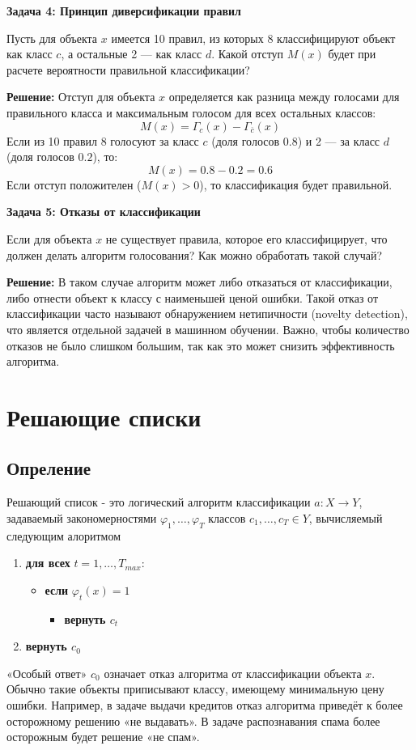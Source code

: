 \textbf{Задача 4: Принцип диверсификации правил}

Пусть для объекта $x$ имеется 10 правил, из которых 8 классифицируют объект как класс $c$, а остальные 2 — как класс $d$. Какой отступ $M(x)$ будет при расчете вероятности правильной классификации?

\textbf{Решение:}  
Отступ для объекта $x$ определяется как разница между голосами для правильного класса и максимальным голосом для всех остальных классов:
\[
M(x) = \Gamma_c(x) - \Gamma_{\overline{c}}(x)
\]
Если из 10 правил 8 голосуют за класс $c$ (доля голосов $0.8$) и 2 — за класс $d$ (доля голосов $0.2$), то:
\[
M(x) = 0.8 - 0.2 = 0.6
\]
Если отступ положителен ($M(x) > 0$), то классификация будет правильной.

\textbf{Задача 5: Отказы от классификации}

Если для объекта $x$ не существует правила, которое его классифицирует, что должен делать алгоритм голосования? Как можно обработать такой случай?

\textbf{Решение:}  
В таком случае алгоритм может либо отказаться от классификации, либо отнести объект к классу с наименьшей ценой ошибки. Такой отказ от классификации часто называют обнаружением нетипичности (novelty detection), что является отдельной задачей в машинном обучении. Важно, чтобы количество отказов не было слишком большим, так как это может снизить эффективность алгоритма.


\section{Решающие списки}
\subsection{Опреление}
    Решающий список - это логический алгоритм классификации $a: X \xrightarrow{} Y$, задаваемый закономерностями $\varphi_1, \dots, \varphi_T$ классов $c_1, \dots, c_T \in Y$, вычисляемый следующим алоритмом

\hline
\begin{enumerate}
    \item \textbf{для всех} $t = 1, \dots, T_{max}$:
    \begin{itemize}
        \item \textbf{если} $\varphi_t(x) = 1$ 
        \begin{itemize}
            \item \textbf{вернуть $c_t$}
        \end{itemize}
    \end{itemize}
    
    \item \textbf{вернуть $c_0$}
\end{enumerate}
\hline
«Особый ответ» $c_0$ означает отказ алгоритма от классификации объекта $x$.
Обычно такие объекты приписывают классу, имеющему минимальную цену ошибки.
Например, в задаче выдачи кредитов отказ алгоритма приведёт к более осторожному решению «не выдавать». В задаче распознавания спама более осторожным будет
решение «не спам».

